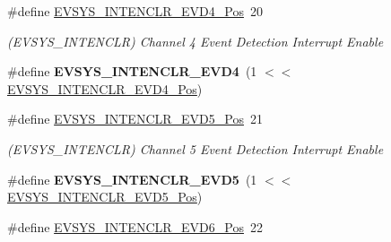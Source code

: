 \begin{DoxyCompactItemize}
\item 
\hypertarget{group___s_a_m_l21___e_v_s_y_s_gaa9392806c2095c093fdbbb794f7323fb}{}\#define \hyperlink{group___s_a_m_l21___e_v_s_y_s_gaa9392806c2095c093fdbbb794f7323fb}{E\+V\+S\+Y\+S\+\_\+\+I\+N\+T\+E\+N\+C\+L\+R\+\_\+\+E\+V\+D4\+\_\+\+Pos}~20\label{group___s_a_m_l21___e_v_s_y_s_gaa9392806c2095c093fdbbb794f7323fb}

\begin{DoxyCompactList}\small\item\em (E\+V\+S\+Y\+S\+\_\+\+I\+N\+T\+E\+N\+C\+L\+R) Channel 4 Event Detection Interrupt Enable \end{DoxyCompactList}\item 
\hypertarget{group___s_a_m_l21___e_v_s_y_s_ga6ee602e0f261dcd538b720d8538eb00d}{}\#define {\bfseries E\+V\+S\+Y\+S\+\_\+\+I\+N\+T\+E\+N\+C\+L\+R\+\_\+\+E\+V\+D4}~(1 $<$$<$ \hyperlink{group___s_a_m_l21___e_v_s_y_s_gaa9392806c2095c093fdbbb794f7323fb}{E\+V\+S\+Y\+S\+\_\+\+I\+N\+T\+E\+N\+C\+L\+R\+\_\+\+E\+V\+D4\+\_\+\+Pos})\label{group___s_a_m_l21___e_v_s_y_s_ga6ee602e0f261dcd538b720d8538eb00d}

\item 
\hypertarget{group___s_a_m_l21___e_v_s_y_s_ga84b35cc35d452081d58c4b0e79dece64}{}\#define \hyperlink{group___s_a_m_l21___e_v_s_y_s_ga84b35cc35d452081d58c4b0e79dece64}{E\+V\+S\+Y\+S\+\_\+\+I\+N\+T\+E\+N\+C\+L\+R\+\_\+\+E\+V\+D5\+\_\+\+Pos}~21\label{group___s_a_m_l21___e_v_s_y_s_ga84b35cc35d452081d58c4b0e79dece64}

\begin{DoxyCompactList}\small\item\em (E\+V\+S\+Y\+S\+\_\+\+I\+N\+T\+E\+N\+C\+L\+R) Channel 5 Event Detection Interrupt Enable \end{DoxyCompactList}\item 
\hypertarget{group___s_a_m_l21___e_v_s_y_s_ga333cf0f44635a865d5bfc765aafde3ce}{}\#define {\bfseries E\+V\+S\+Y\+S\+\_\+\+I\+N\+T\+E\+N\+C\+L\+R\+\_\+\+E\+V\+D5}~(1 $<$$<$ \hyperlink{group___s_a_m_l21___e_v_s_y_s_ga84b35cc35d452081d58c4b0e79dece64}{E\+V\+S\+Y\+S\+\_\+\+I\+N\+T\+E\+N\+C\+L\+R\+\_\+\+E\+V\+D5\+\_\+\+Pos})\label{group___s_a_m_l21___e_v_s_y_s_ga333cf0f44635a865d5bfc765aafde3ce}

\item 
\hypertarget{group___s_a_m_l21___e_v_s_y_s_ga1e548947abb6863da33c41d8128be55f}{}\#define \hyperlink{group___s_a_m_l21___e_v_s_y_s_ga1e548947abb6863da33c41d8128be55f}{E\+V\+S\+Y\+S\+\_\+\+I\+N\+T\+E\+N\+C\+L\+R\+\_\+\+E\+V\+D6\+\_\+\+Pos}~22\label{group___s_a_m_l21___e_v_s_y_s_ga1e548947abb6863da33c41d8128be55f}


\end{DoxyCompactItemize}
